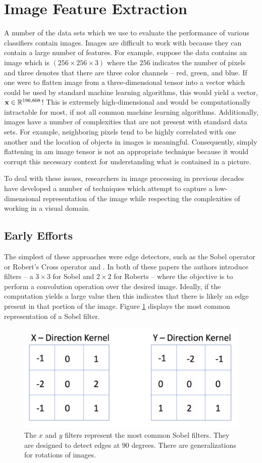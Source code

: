 \documentclass[../thesis.tex]{subfiles}
\begin{document}
\section{Image Feature Extraction}
A number of the data sets which we use to evaluate the performance of various
classifiers contain images. Images are difficult to work with because they can
contain a large number of features. For example, suppose the data contains an
image which is $(256 \times 256 \times 3)$ where the $256$ indicates the number
of pixels and three denotes that there are three color channels -- red, green,
and blue. If one were to flatten image from a three-dimensional tensor into a
vector which could be used by standard machine learning algorithms, this would
yield a vector, $\mathbf{x} \in \mathbb{R}^{196,608}$! This is extremely
high-dimensional and would be computationally intractable for most, if not all
common machine learning algorithms. Additionally, images have a number of
complexities that are not present with standard data sets. For example,
neighboring pixels tend to be highly correlated with one another and the
location of objects in images is meaningful. Consequently, simply flattening in
am image tensor is not an appropriate technique because it would corrupt this
necessary context for understanding what is contained in a picture.

To deal with these issues, researchers in image processing in previous decades
have developed a number of techniques which attempt to capture a low-dimensional
representation of the image while respecting the complexities of working in a
visual domain.

\subsection{Early Efforts}
The simplest of these approaches were edge detectors, such as the Sobel operator
or Robert's Cross operator \cite{sobel19683x3} and \cite{roberts1963machine}. In
both of these papers the authors introduce filters -- a $3 \times 3$ for Sobel
and $2 \times 2$ for Roberts -- where the objective is to perform a convolution
operation over the desired image. Ideally, if the computation yields a large
value then this indicates that there is likely an edge present in that portion
of the image. Figure \ref{fig:sobel_filter} displays the most common
representation of a Sobel filter.
\begin{figure}
    \centering
    \includegraphics[width=.7\linewidth]{images/sobmasks.pdf}
    \caption[Sobel Filter]{The $x$ and $y$ filters represent the most common
    Sobel filters. They are designed to detect edges at $90$ degrees. There are
    generalizations for rotations of images.}
    \label{fig:sobel_filter}
\end{figure}
\end{document}
